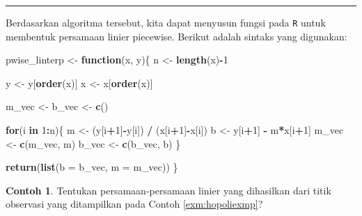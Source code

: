 \documentclass[
]{book}
\newenvironment{Shaded}{\begin{snugshade}}{\end{snugshade}}
\newcommand{\AttributeTok}[1]{\textcolor[rgb]{0.13,0.29,0.53}{#1}}
\newcommand{\ControlFlowTok}[1]{\textcolor[rgb]{0.13,0.29,0.53}{\textbf{#1}}}
\newcommand{\DecValTok}[1]{\textcolor[rgb]{0.00,0.00,0.81}{#1}}
\newcommand{\FunctionTok}[1]{\textcolor[rgb]{0.13,0.29,0.53}{\textbf{#1}}}
\newcommand{\NormalTok}[1]{#1}
\newcommand{\OtherTok}[1]{\textcolor[rgb]{0.56,0.35,0.01}{#1}}
\newcommand{\SpecialCharTok}[1]{\textcolor[rgb]{0.81,0.36,0.00}{\textbf{#1}}}
\theoremstyle{definition}
\theoremstyle{definition}
\newtheorem{example}{Contoh}[chapter]
\theoremstyle{definition}
\theoremstyle{definition}
\theoremstyle{remark}
\begin{document}
\begin{center}\rule{0.5\linewidth}{0.5pt}\end{center}

Berdasarkan algoritma tersebut, kita dapat menyusun fungsi pada \texttt{R} untuk membentuk persamaan linier piecewise. Berikut adalah sintaks yang digunakan:

\begin{Shaded}
\begin{Highlighting}[]
\NormalTok{pwise\_linterp }\OtherTok{\textless{}{-}} \ControlFlowTok{function}\NormalTok{(x, y)\{}
\NormalTok{  n }\OtherTok{\textless{}{-}} \FunctionTok{length}\NormalTok{(x)}\SpecialCharTok{{-}}\DecValTok{1}
  
\NormalTok{  y }\OtherTok{\textless{}{-}}\NormalTok{ y[}\FunctionTok{order}\NormalTok{(x)]}
\NormalTok{  x }\OtherTok{\textless{}{-}}\NormalTok{ x[}\FunctionTok{order}\NormalTok{(x)]}
  
\NormalTok{  m\_vec }\OtherTok{\textless{}{-}}\NormalTok{ b\_vec }\OtherTok{\textless{}{-}} \FunctionTok{c}\NormalTok{()}
  
  \ControlFlowTok{for}\NormalTok{(i }\ControlFlowTok{in} \DecValTok{1}\SpecialCharTok{:}\NormalTok{n)\{}
\NormalTok{    m }\OtherTok{\textless{}{-}}\NormalTok{ (y[i}\SpecialCharTok{+}\DecValTok{1}\NormalTok{]}\SpecialCharTok{{-}}\NormalTok{y[i]) }\SpecialCharTok{/}\NormalTok{ (x[i}\SpecialCharTok{+}\DecValTok{1}\NormalTok{]}\SpecialCharTok{{-}}\NormalTok{x[i])}
\NormalTok{    b }\OtherTok{\textless{}{-}}\NormalTok{ y[i}\SpecialCharTok{+}\DecValTok{1}\NormalTok{] }\SpecialCharTok{{-}}\NormalTok{ m}\SpecialCharTok{*}\NormalTok{x[i}\SpecialCharTok{+}\DecValTok{1}\NormalTok{]}
\NormalTok{    m\_vec }\OtherTok{\textless{}{-}} \FunctionTok{c}\NormalTok{(m\_vec, m)}
\NormalTok{    b\_vec }\OtherTok{\textless{}{-}} \FunctionTok{c}\NormalTok{(b\_vec, b)}
\NormalTok{  \}}
  
  \FunctionTok{return}\NormalTok{(}\FunctionTok{list}\NormalTok{(}\AttributeTok{b =}\NormalTok{ b\_vec, }\AttributeTok{m =}\NormalTok{ m\_vec))}
\NormalTok{\}}
\end{Highlighting}
\end{Shaded}

\begin{example}
\protect\hypertarget{exm:pwiselinexm}{}\label{exm:pwiselinexm}Tentukan persamaan-persamaan linier yang dihasilkan dari titik observasi yang ditampilkan pada Contoh \ref{exm:hopoliexmp}?
\end{example}
\end{document}
